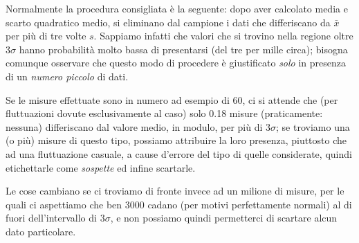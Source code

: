 Normalmente la procedura consigliata \`e la seguente: dopo
aver calcolato media e scarto quadratico medio, si eliminano
dal campione i dati che differiscano da $\bar x$ per pi\`u
di tre volte $s$.  Sappiamo infatti che valori che si
trovino nella regione oltre $3 \sigma$ hanno probabilit\`a
molto bassa di presentarsi (del tre per mille circa);
bisogna comunque osservare che questo modo di procedere \`e
giustificato \emph{solo} in presenza di un \emph{numero
  piccolo} di dati.

Se le misure effettuate sono in numero ad esempio di 60, ci
si attende che (per fluttuazioni dovute esclusivamente al
caso) solo 0.18 misure (praticamente: nessuna) differiscano
dal valore medio, in modulo, per pi\`u di $3 \sigma$; se
troviamo una (o pi\`u) misure di questo tipo, possiamo
attribuire la loro presenza, piuttosto che ad una
fluttuazione casuale, a cause d'errore del tipo di quelle
considerate, quindi etichettarle come \emph{sospette} ed
infine scartarle.

Le cose cambiano se ci troviamo di fronte invece ad un
milione di misure, per le quali ci aspettiamo che ben 3000
cadano (per motivi perfettamente normali) al di fuori
dell'intervallo di $3 \sigma$, e non possiamo quindi
permetterci di scartare alcun dato particolare.%

